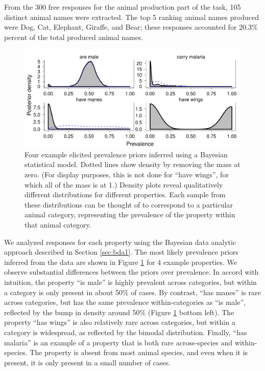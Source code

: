 \documentclass[10pt,letterpaper]{article}
\begin{document}
From the 300 free responses for the animal production part of the task, 105 distinct animal names were extracted. The top 5 ranking animal names produced were Dog, Cat, Elephant, Giraffe, and Bear; these responses accounted for 20.3\% percent of the total produced animal names.

\begin{figure}
\centering
    \includegraphics[width=0.8\columnwidth]{prevalence_priors_inferred-betas.pdf}
    \caption{Four example elicited prevalence priors inferred using a Bayesian statistical model. 
    Dotted lines show density by removing the mass at zero. (For display purposes, this is not done for ``have wings'', for which all of the mass is at 1.)
    Density plots reveal qualitatively different distributions for different properties. 
    Each sample from these distributions can be thought of to correspond to a particular animal category, representing the prevalence of the property within that animal category.}
  \label{fig:priors1a}
\end{figure}


We analyzed responses for each property using the Bayesian data analytic approach described in Section \ref{sec:bda1}.	
The most likely prevalence priors inferred from the data are shown in Figure \ref{fig:priors1a} for 4 example properties.
We observe substantial differences between the priors over prevalence. 
In accord with intuition, the property ``is male'' is highly prevalent across categories, but within a category is only present in about 50\% of cases.
By contrast, ``has manes'' is rare across categories, but has the same prevalence within-categories as ``is male'', reflected by the bump in density around 50\% (Figure \ref{fig:priors1a} bottom left).
The property ``has wings'' is also relatively rare across categories, but within a category is widespread, as reflected by the bimodal distribution. 
Finally, ``has malaria'' is an example of a property that is both rare across-species and within-species. 
The property is absent from most animal species, and even when it is present, it is only present in a small number of cases.
\end{document}
